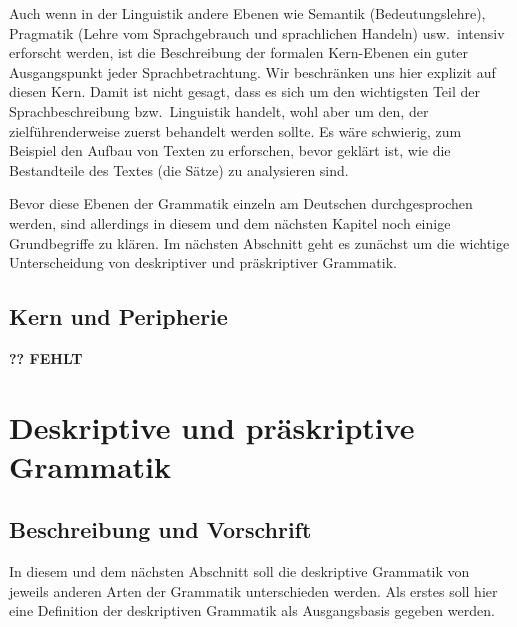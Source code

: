 Auch wenn in der Linguistik andere Ebenen wie Semantik (Bedeutungslehre), Pragmatik (Lehre vom Sprachgebrauch und sprachlichen Handeln) usw.\ intensiv erforscht werden, ist die Beschreibung der formalen Kern-Ebenen ein guter Ausgangspunkt jeder Sprachbetrachtung.
Wir beschränken uns hier explizit auf diesen Kern.
Damit ist nicht gesagt, dass es sich um den wichtigsten Teil der Sprachbeschreibung bzw.\ Linguistik handelt, wohl aber um den, der zielführenderweise zuerst behandelt werden sollte.
Es wäre schwierig, zum Beispiel den Aufbau von Texten zu erforschen, bevor geklärt ist, wie die Bestandteile des Textes (die Sätze) zu analysieren sind.

Bevor diese Ebenen der Grammatik einzeln am Deutschen durchgesprochen werden, sind allerdings in diesem und dem nächsten Kapitel noch einige Grundbegriffe zu klären.
Im nächsten Abschnitt geht es zunächst um die wichtige Unterscheidung von deskriptiver und präskriptiver Grammatik.

\subsection{Kern und Peripherie}

\label{sec:kern}

\textbf{?? FEHLT}

\section{Deskriptive und präskriptive Grammatik}

\label{sec:deskriptivnormativ}

\subsection{Beschreibung und Vorschrift}

In diesem und dem nächsten Abschnitt soll die deskriptive Grammatik von jeweils anderen Arten der Grammatik unterschieden werden.
Als erstes soll hier eine Definition der deskriptiven Grammatik als Ausgangsbasis gegeben werden.


